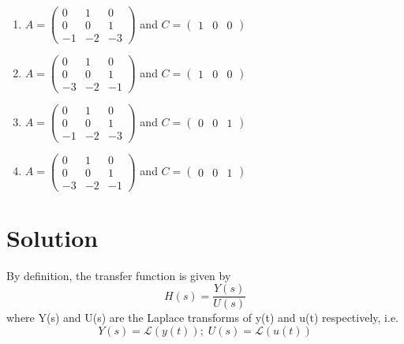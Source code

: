 \documentclass[journal,12pt,twocolumn]{IEEEtran}
\begin{document}
\begin{enumerate}[label = (\Alph*)]
    \item $A = \begin{pmatrix}
     0 &  1 &  0\\ 
     0 &  0 &  1\\
    -1 & -2 & -3
    \end{pmatrix}$ and $C = \begin{pmatrix}1 & 0 & 0\end{pmatrix}$
    \item $A = \begin{pmatrix}
     0 &  1 &  0\\ 
     0 &  0 &  1\\
    -3 & -2 & -1
    \end{pmatrix}$ and $C = \begin{pmatrix}1 & 0 & 0\end{pmatrix}$
    \item $A = \begin{pmatrix}
     0 &  1 &  0\\ 
     0 &  0 &  1\\
    -1 & -2 & -3
    \end{pmatrix}$ and $C = \begin{pmatrix}0 & 0 & 1\end{pmatrix}$
    \item $A = \begin{pmatrix}
     0 &  1 &  0\\ 
     0 &  0 &  1\\
    -3 & -2 & -1
    \end{pmatrix}$ and $C = \begin{pmatrix}0 & 0 & 1\end{pmatrix}$
\end{enumerate}

\section{Solution}

By definition, the transfer function is given by 
\begin{equation}
    H(s) = \dfrac{Y(s)}{U(s)}
\end{equation}
where Y(s) and U(s) are the Laplace transforms of y(t) and u(t) respectively, i.e.
\begin{equation}
    Y(s) = \mathcal{L}(y(t)); \;U(s) = \mathcal{L}(u(t))
\end{equation}
\end{document}
